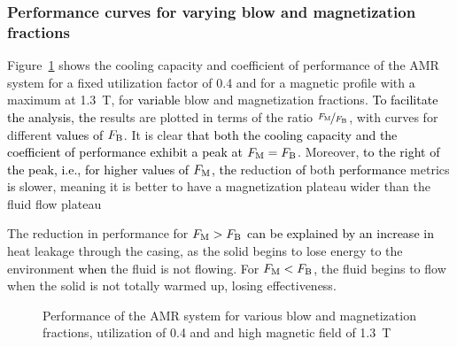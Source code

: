 \documentclass[referee]{svjour3}
\begin{document}
\subsubsection{Performance curves for varying blow and magnetization fractions}
\label{sec:perf-curv-vary}

Figure~\ref{fig:Qc_COP_curves_phi40} shows the cooling capacity and coefficient of performance of the AMR system for a fixed utilization factor of \num{0.4} and for a magnetic profile with \textcolor{black}{a} maximum at \SI{1.3}{\tesla}, for \textcolor{black}{variable} blow and magnetization fractions. \textcolor{black}{To facilitate the analysis, the} results are plotted in terms of the ratio $\nicefrac{F_{\mathrm{M}}}{F_{\mathrm{B}}}$, with curves for different \textcolor{black}{values of} $F_{\mathrm{B}}$. It is clear \textcolor{black}{that both the cooling capacity and the coefficient of performance exhibit a peak at} $F_{\mathrm{M}} = F_{\mathrm{B}}$. Moreover,  \textcolor{black}{to the right of the peak, i.e., for higher values of $F_{\mathrm{M}}$, the}  reduction \textcolor{black}{of} both \textcolor{black}{performance} metrics \textcolor{black}{is} slower, meaning it is better to have a magnetization plateau wider than the fluid flow plateau 

The reduction in performance for $F_{\mathrm{M}} > F_{\mathrm{B}}$ \textcolor{black}{can be explained by an increase in} heat leakage through the casing, as the solid begins to lose energy to the environment \textcolor{black}{when} the fluid is not flowing. For $F_{\mathrm{M}} < F_{\mathrm{B}}$,  the fluid begins to flow when the solid is not totally warmed up, losing effectiveness.

\begin{figure}[!ht]
  \centering
\quad
  \caption{Performance of the AMR system for various blow and magnetization fractions, utilization of 0.4 and and high magnetic field of \SI{1.3}{\tesla}}
  \label{fig:Qc_COP_curves_phi40}
\end{figure}
\end{document}
